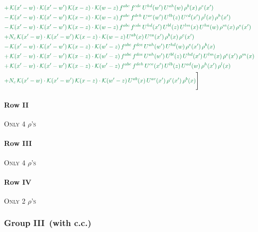 \documentclass[10pt]{article}
\numberwithin{equation}{section}
\begin{document}
\begin{align}
&{\color{JIM} +\,\mathcal{K}(x'-w)\cdot\mathcal{K}(x'-w')\,\mathcal{K}(x-z)\cdot\mathcal{K}(w-z)\,f^{abc}\,f^{cde}\,U^{hd}(w')\,U^{ah}(w)\,\rho^{b}(x)\,\rho^{e}(x')} \notag\\
&{\color{JIM} -\,\mathcal{K}(x'-w)\cdot\mathcal{K}(x'-w')\,\mathcal{K}(x-z)\cdot\mathcal{K}(w-z)\,f^{abc}\,f^{deh}\,U^{ae}(w')\,U^{lb}(z)\,U^{cd}(x')\,\rho^{l}(x)\,\rho^{h}(x')} \notag\\
&{\color{JIM} -\,\mathcal{K}(x'-w)\cdot\mathcal{K}(x'-w')\,\mathcal{K}(x-z)\cdot\mathcal{K}(w-z)\,f^{abc}\,f^{cde}\,U^{hd}(x')\,U^{bl}(z)\,U^{lm}(x)\,U^{ha}(w)\,\rho^{m}(x)\,\rho^{e}(x')} \notag\\
&{\color{JIM} +N_{c}\,\mathcal{K}(x'-w)\cdot\mathcal{K}(x'-w')\,\mathcal{K}(x-z)\cdot\mathcal{K}(w-z)\,U^{ab}(x)\,U^{ca}(x')\,\rho^{b}(x)\,\rho^{c}(x')} \notag\\
&{\color{JIM} -\,\mathcal{K}(x'-w)\cdot\mathcal{K}(x'-w')\,\mathcal{K}(x-z)\cdot\mathcal{K}(w'-z)\,f^{abc}\,f^{dce}\,U^{ah}(w')\,U^{hd}(w)\,\rho^{e}(x')\,\rho^{b}(x)} \notag\\
&{\color{JIM} +\,\mathcal{K}(x'-w)\cdot\mathcal{K}(x'-w')\,\mathcal{K}(x-z)\cdot\mathcal{K}(w'-z)\,f^{abc}\,f^{dce}\,U^{ah}(w')\,U^{bl}(z)\,U^{hd}(x')\,U^{lm}(x)\,\rho^{e}(x')\,\rho^{m}(x)} \notag\\
&{\color{JIM} +\,\mathcal{K}(x'-w)\cdot\mathcal{K}(x'-w')\,\mathcal{K}(x-z)\cdot\mathcal{K}(w'-z)\,f^{abc}\,f^{deh}\,U^{ce}(x')\,U^{lb}(z)\,U^{ad}(w)\,\rho^{h}(x')\,\rho^{l}(x)} \notag\\
&{\color{JIM} +N_{c}\,\mathcal{K}(x'-w)\cdot\mathcal{K}(x'-w')\,\mathcal{K}(x-z)\cdot\mathcal{K}(w'-z)\,U^{ab}(x)\,U^{ac}(x')\,\rho^{c}(x')\,\rho^{b}(x)}\Bigg] \end{align}
\paragraph{Row II}
\textsc{Only 4 $\rho$'s}
\paragraph{Row III}
\textsc{Only 4 $\rho$'s}
\paragraph{Row IV}
\textsc{Only 2 $\rho$'s}
\subsubsection*{Group III\, (with c.c.)}
\end{document}
